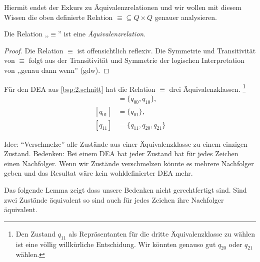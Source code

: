 Hiermit endet der Exkurs zu Äquivalenzrelationen und wir wollen mit diesem Wissen die oben definierte Relation $\equiv\subseteq Q\times Q$ genauer analysieren.

\begin{lemma}[name={[$\equiv$ ist Äquivalenzrelation]}] %
        Die Relation ,,$\equiv$'' ist eine \emph{Äquivalenzrelation}.
\end{lemma}
\begin{proof}

  Die Relation $\equiv$ ist offensichtlich reflexiv.
  Die Symmetrie und Transitivität von $\equiv$ folgt aus der Transitivität und Symmetrie der logischen Interpretation von ,,genau dann wenn'' (gdw).
\end{proof}


\begin{Bsp} 
Für den \ac{DEA} aus \autoref{bsp:2.schnitt} hat die Relation $\equiv$ drei Äquivalenzklassen.
\footnote{Den Zustand $q_{11}$ als Repräsentanten für die dritte Äquivalenzklasse zu wählen ist eine völlig willkürliche Entschidung. 
Wir könnten genauso gut $q_{20}$ oder $q_{21}$ wählen.}
\begin{align*}
 [q_{00}] & = \{q_{00}, q_{10}\},\\
 [q_{01}] & = \{q_{01}\},\\
 [q_{11}] & = \{q_{11}, q_{20}, q_{21}\}
\end{align*}
\end{Bsp}





Idee: ``Verschmelze'' alle Zustände aus einer Äquivalenzklasse zu einem einzigen Zustand.
Bedenken: Bei einem \ac{DEA} hat jeder Zustand hat für jedes Zeichen einen Nachfolger. 
Wenn wir Zustände verschmelzen könnte es mehrere Nachfolger geben und das Resultat wäre kein wohldefinierter \ac{DEA} mehr.

Das folgende Lemma zeigt dass unsere Bedenken nicht gerechtfertigt sind. 
Sind zwei Zustände äquivalent so sind auch für jedes Zeichen ihre Nachfolger äquivalent.


